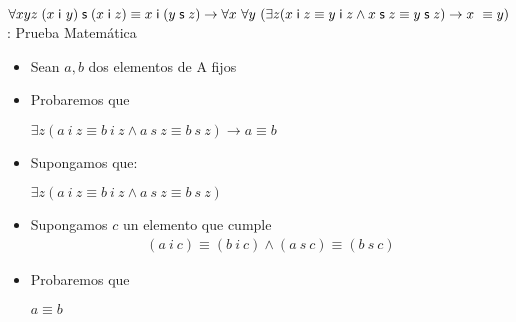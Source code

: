 \documentclass[10pt]{beamer}
\newcommand{\Cfonti}{\fontsize{8.5}{7.2}\selectfont}
\newcommand{\idistr}{\forall xyz\;(x\;\mathsf{i}\
y)\;\mathsf{s}\;(x\;\mathsf{i}\;z)\equiv x\;\mathsf{i}\;(y\;\mathsf{s}%
\;z)}
\newcommand{\myconj}{x\;\mathsf{i}\;z\equiv y\;\mathsf{%
i}\;z\wedge x\;\mathsf{s}\;z\equiv y\;\mathsf{s}\;z}
\begin{document}
\begin{frame}{\Cfonti$\idistr \rightarrow \forall x\ \forall y\ (\exists z (\myconj) \rightarrow x\ \equiv y)$:
   Prueba Matemática}
  \begin{itemize}[<+->]

    \item Sean $a, b$ dos elementos de A fijos
    \item Probaremos que
    \begin{center}
      $\exists z (a\ i\ z \equiv b\ i\ z \wedge a\ s\ z \equiv b\ s\ z) \rightarrow a \equiv b$
    \end{center}
    \item Supongamos que:
    \begin{center}
      $\exists z (a\ i\ z \equiv b\ i\ z \wedge a\ s\ z \equiv b\ s\ z)$
    \end{center}

    \item Supongamos $c$ un elemento que cumple
    \begin{align}
      (a\ i\ c) \equiv (b\ i\ c) \wedge (a\ s\ c) \equiv (b\ s\ c)
    \end{align}
    \item Probaremos que
    \begin{center}
      $a \equiv b$
    \end{center}
  \end{itemize}
\end{frame}
\end{document}
